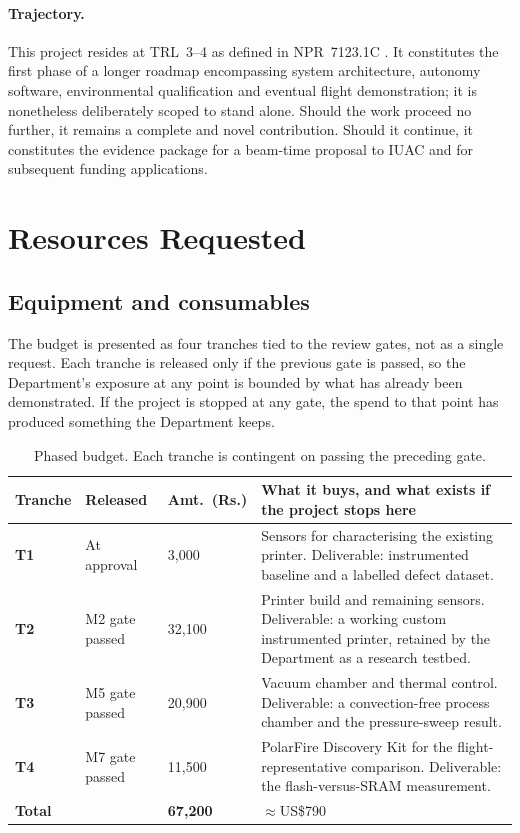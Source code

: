 \documentclass[11pt,a4paper]{article}
\newcommand{\rupee}{\textrm{Rs.}}
\begin{document}
\paragraph{Trajectory.}
This project resides at TRL~3--4 as defined in NPR~7123.1C \cite{npr71231c}. It
constitutes the first phase of a longer roadmap encompassing system architecture,
autonomy software, environmental qualification and eventual flight
demonstration; it is nonetheless deliberately scoped to stand alone. Should the
work proceed no further, it remains a complete and novel contribution. Should it
continue, it constitutes the evidence package for a beam-time proposal to IUAC
and for subsequent funding applications.

\section{Resources Requested}

\subsection{Equipment and consumables}

The budget is presented as four tranches tied to the review gates, not as a
single request. Each tranche is released only if the previous gate is passed, so
the Department's exposure at any point is bounded by what has already been
demonstrated. If the project is stopped at any gate, the spend to that point has
produced something the Department keeps.

\begin{table}[htbp]
\centering
\caption{Phased budget. Each tranche is contingent on passing the preceding
gate.}
\label{tab:phases}
\small
\begin{tabularx}{\textwidth}{@{}L{1.5cm} L{2.1cm} L{2.0cm} X@{}}
\toprule
\textbf{Tranche} & \textbf{Released} & \textbf{Amt.\ (\rupee)} &
\textbf{What it buys, and what exists if the project stops here} \\
\midrule
\textbf{T1} & At approval & 3{,}000 &
Sensors for characterising the existing printer. Deliverable: instrumented
baseline and a labelled defect dataset. \\
\textbf{T2} & M2 gate passed & 32{,}100 &
Printer build and remaining sensors. Deliverable: a working custom instrumented
printer, retained by the Department as a research testbed. \\
\textbf{T3} & M5 gate passed & 20{,}900 &
Vacuum chamber and thermal control. Deliverable: a convection-free process
chamber and the pressure-sweep result. \\
\textbf{T4} & M7 gate passed & 11{,}500 &
PolarFire Discovery Kit for the flight-representative comparison. Deliverable:
the flash-versus-SRAM measurement. \\
\midrule
\textbf{Total} & & \textbf{67{,}200} & \(\approx\)US\$790 \\
\bottomrule
\end{tabularx}
\end{table}
\end{document}

